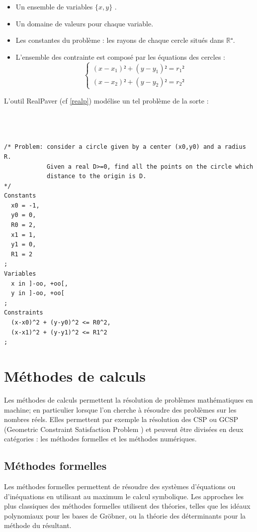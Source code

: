 \begin{itemize}
\item
Un ensemble de variables $\{x,y\}$ .
\item
Un domaine de valeurs pour chaque variable. 
\item
Les constantes du problème : les rayons de chaque cercle situés dans  $\mathbb{R⁺}$.
\item
L'ensemble des contrainte est composé par les équations des cercles :
\begin{equation}\label{eq}
\begin{cases}
(x-x_1)²+(y-y_1)² = r_1²\\
(x-x_2)²+(y-y_2)² = r_2²
\end{cases}
\end{equation}
\end{itemize}
\clearpage
L'outil RealPaver (cf \ref{realp}) modélise un tel problème de la sorte :
\begin{verbatim}



/* Problem: consider a circle given by a center (x0,y0) and a radius R.
            Given a real D>=0, find all the points on the circle which
            distance to the origin is D.
*/
Constants
  x0 = -1,
  y0 = 0,
  R0 = 2,
  x1 = 1,
  y1 = 0,
  R1 = 2
;
Variables
  x in ]-oo, +oo[,
  y in ]-oo, +oo[
;
Constraints
  (x-x0)^2 + (y-y0)^2 <= R0^2,
  (x-x1)^2 + (y-y1)^2 <= R1^2
;
\end{verbatim}
\section{Méthodes de calculs}
Les méthodes de calculs permettent la résolution de problèmes mathématiques en machine; en particulier lorsque l'on cherche à résoudre des problèmes sur les nombres réels. Elles permettent par exemple la résolution des \textsc{CSP}  ou \textsc{GCSP} (Geometric Constraint Satisfaction Problem \cite{Jermann}) et peuvent être divisées en deux catégories : les méthodes formelles et les méthodes numériques.


\subsection{Méthodes formelles}
Les méthodes formelles permettent de résoudre des systèmes d'équations ou d'inéquations en utilisant au maximum le calcul symbolique. Les approches les plus classiques des méthodes formelles utilisent des théories, telles que les idéaux polynomiaux pour les bases de Gröbner, ou la théorie des déterminants pour la méthode du résultant.

